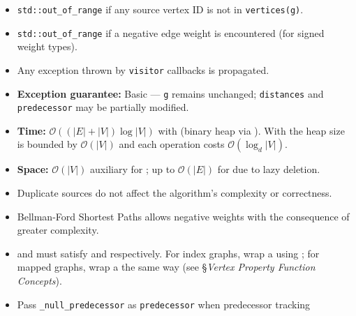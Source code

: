 \begin{itemdescr}
      \pnum\throws
            \begin{itemize}
                  \item \lstinline{std::out_of_range} if any source vertex ID is not in \lstinline{vertices(g)}.
                  \item \lstinline{std::out_of_range} if a negative edge weight is encountered
                        (for signed weight types).
                  \item Any exception thrown by \lstinline{visitor} callbacks is propagated.
                  \item \textbf{Exception guarantee:} Basic --- \lstinline{g} remains unchanged;
                        \lstinline{distances} and \lstinline{predecessor} may be partially modified.
            \end{itemize}
      \pnum\complexity
            \begin{itemize}
                  \item \textbf{Time:} $\mathcal{O}((|E| + |V|)\log{|V|})$ with 
                        (binary heap via ).
                        With  the heap size is bounded by $\mathcal{O}(|V|)$
                        and each operation costs $\mathcal{O}(\log_{d}{|V|})$.
                  \item \textbf{Space:} $\mathcal{O}(|V|)$ auxiliary for ;
                        up to $\mathcal{O}(|E|)$ for  due to lazy deletion.
            \end{itemize}
      \pnum\remarks 
            \begin{itemize}
                  \item Duplicate sources do not affect the algorithm's complexity or correctness.
                  \item Bellman-Ford Shortest Paths allows negative weights with the consequence of greater complexity.
                  \item {} and  must satisfy 
                        and  respectively.  For index graphs, wrap a 
                        using ; for mapped graphs, wrap a 
                        the same way (see §\textit{Vertex Property Function Concepts}).
                  \item Pass \lstinline{_null_predecessor} as \lstinline{predecessor} when predecessor tracking

\end{itemize}
\end{itemdescr}
